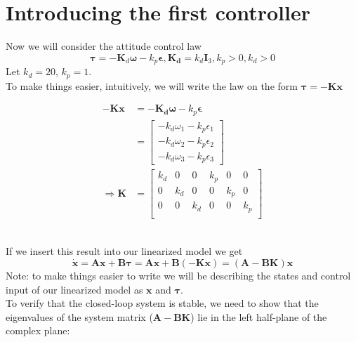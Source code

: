 \section{Introducing the first controller}
 
Now we will consider the attitude control law
\begin{equation*}
    \boldsymbol{\tau} = -\mathbf{K}_d \boldsymbol{\omega} - k_p \boldsymbol{\epsilon}, \mathbf{K_d} = k_d \mathbf{I}_3, k_p > 0, k_d > 0
\end{equation*}
Let $k_d = 20$, $k_p = 1$. \\
To make things easier, intuitively, we will write the law on the form $\boldsymbol{\tau} = \mathbf{-Kx}$
\begin{equations}
    \begin{align*}
        -\mathbf{Kx} &= -\mathbf{K_d} \boldsymbol{\omega} -k_p\boldsymbol{\epsilon}\\
        &=
        \begin{bmatrix}
            -k_d\omega_1 -k_p\epsilon_1\\
            -k_d\omega_2 -k_p\epsilon_2\\
            -k_d\omega_3 -k_p\epsilon_3
        \end{bmatrix}\\
        \Rightarrow \mathbf{K} &=
        \begin{bmatrix}
            k_d  &   0   &   0   &   k_p   &   0   &   0\\
            0   &   k_d  &   0   &   0   &   k_p   &   0\\
            0   &   0   &   k_d  &   0   &   0   &   k_p\\
        \end{bmatrix}
    \end{align*}
\end{equations} \\

If we insert this result into our linearized model we get
\begin{equation*}
    \mathbf{\dot x} = \mathbf{Ax+B}\boldsymbol{\tau} = \mathbf{Ax + B(-Kx)} = \mathbf{(A-BK)x}
\end{equation*}
Note: to make things easier to write we will be describing the states and control input of our linearized model as $\mathbf{x}$ and $\boldsymbol{\tau}$. \\

To verify that the closed-loop system is stable, we need to show that the eigenvalues of the system matrix ($\mathbf{A-BK}$) lie in the left half-plane of the complex plane:

